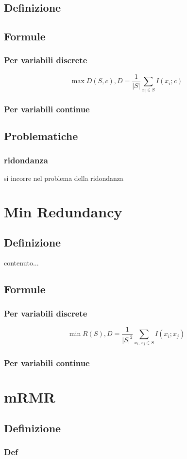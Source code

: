 \documentclass{beamer}
\begin{document}
\subsection{Definizione}
\subsection{Formule}
\begin{frame}
	\frametitle{Per variabili discrete}
	$$\max D(S,c), D= \frac{1}{|S|} \sum\limits_{x_i \in S} I (x_i;c)$$
\end{frame}
\begin{frame}
	\frametitle{Per variabili continue}
\end{frame}
\subsection{Problematiche}
\begin{frame}
	\frametitle{ridondanza}
	si incorre nel problema della ridondanza
\end{frame}

\section{Min Redundancy}
\subsection{Definizione}
\begin{frame}
	contenuto...
\end{frame}
\subsection{Formule}
\begin{frame}
	\frametitle{Per variabili discrete}
	$$\min R(S), D= \frac{1}{|S|^2} \sum\limits_{x_i,x_j \in S} I (x_i;x_j)$$
\end{frame}
\begin{frame}
	\frametitle{Per variabili continue}
\end{frame}


\section{mRMR}
\subsection{Definizione}
\begin{frame}
	\frametitle{Def}
\end{frame}
\end{document}
